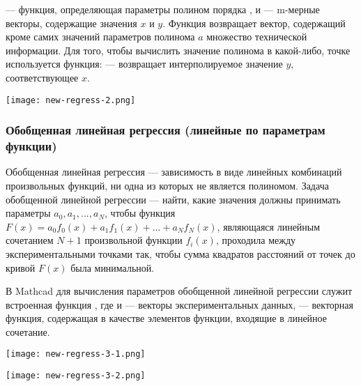  --- функция, определяющая параметры полином порядка ,  и  --- m-мерные векторы, содержащие значения $x$ и $y$. Функция  возвращает вектор, содержащий кроме самих значений параметров полинома $a$ множество технической информации. Для того, чтобы вычислить значение полинома в какой-либо, точке используется функция:  --- возвращает интерполируемое значение $y$, соответствующее $x$.


\begin{center}
	\texttt{[image: new-regress-2.png]}
\end{center}


\subsubsection{Обобщенная линейная регрессия (линейные по параметрам функции)}
Обобщенная линейная регрессия --- зависимость в виде линейных комбинаций произвольных функций, ни одна из которых не является полиномом.
Задача обобщенной линейной регрессии --- найти, какие значения должны принимать параметры $a_0, a_1, ..., a_N$, чтобы функция  $F(x)=a_0 f_0(x)+a_1 f_1(x)+ ... + a_N f_N(x)$, являющаяся линейным сочетанием $N+1$ произвольной функции $f_i(x)$, проходила между экспериментальными точками так, чтобы сумма квадратов расстояний от точек до кривой $F(x)$ была минимальной.

В Mathcad для вычисления параметров обобщенной линейной регрессии служит встроенная функция , где  и  --- векторы экспериментальных данных,  --- векторная функция, содержащая в качестве элементов функции, входящие в линейное сочетание.


\begin{center}
	\texttt{[image: new-regress-3-1.png]}
\end{center}
\begin{center}
	\texttt{[image: new-regress-3-2.png]}
\end{center}


